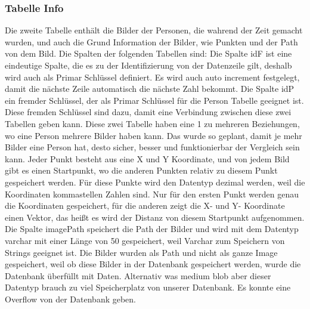 \subsubsection{Tabelle Info}
Die zweite Tabelle enthält die Bilder der Personen, die wahrend der Zeit gemacht wurden, und auch die Grund Information der Bilder, wie Punkten und der Path von dem Bild. Die Spalten der folgenden Tabellen sind:
\bigbreak
Die Spalte idF ist eine eindeutige Spalte, die es zu der Identifizierung von der Datenzeile gilt, deshalb wird auch als Primar Schlüssel definiert. Es wird auch auto increment festgelegt, damit die nächste Zeile automatisch die nächste Zahl bekommt.
\bigbreak
Die Spalte idP ein fremder Schlüssel, der als Primar Schlüssel für die Person Tabelle geeignet ist. Diese fremden Schlüssel sind dazu, damit eine Verbindung zwischen diese zwei Tabellen geben kann. Diese zwei Tabelle haben eine 1 zu mehreren Beziehungen, wo eine Person mehrere Bilder haben kann. Das wurde so geplant, damit je mehr Bilder eine Person hat, desto sicher, besser und funktionierbar der Vergleich sein kann.
\bigbreak
Jeder Punkt besteht aus eine X und Y Koordinate, und von jedem Bild gibt es einen Startpunkt, wo die anderen Punkten relativ zu diesem Punkt gespeichert werden. Für diese Punkte wird den Datentyp dezimal werden, weil die Koordinaten kommastellen Zahlen sind. Nur für den ersten Punkt werden genau die Koordinaten gespeichert, für die anderen zeigt die X- und Y- Koordinate einen Vektor, das heißt es wird der Distanz von diesem Startpunkt aufgenommen.
\bigbreak
Die Spalte imagePath speichert die Path der Bilder und wird mit dem Datentyp varchar mit einer Länge von 50 gespeichert, weil Varchar zum Speichern von Strings geeignet ist. Die Bilder wurden als Path und nicht als ganze Image gespeichert, weil ob diese Bilder in der Datenbank gespeichert werden, wurde die Datenbank überfüllt mit Daten. Alternativ was medium blob aber dieser Datentyp brauch zu viel Speicherplatz von unserer Datenbank. Es konnte eine Overflow von der Datenbank geben.

